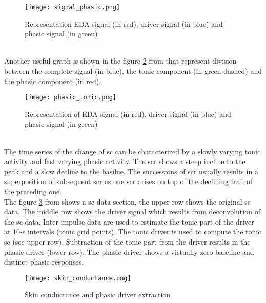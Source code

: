 \begin{figure}[h]
    \centering
    \texttt{[image: signal\_phasic.png]} 
	\caption{Representation EDA signal (in red), driver signal (in blue) and phasic signal (in green)}
    \label{fig:signal_phasic}
\end{figure}
\\
Another useful graph is shown in the figure \ref{fig:phasic_tonic} from \cite{hernandez2014using} that represent division between the complete signal (in blue), the tonic component (in green-dashed) and the phasic component (in red).
\begin{figure}[h]
    \centering
    \texttt{[image: phasic\_tonic.png]} 
	\caption{Representation of EDA signal (in red), driver signal (in blue) and phasic signal (in green)}
    \label{fig:phasic_tonic}
\end{figure}
\\
The time series of the change of \gls{sc} can be characterized by a slowly varying tonic activity and fast varying phasic activity. The \gls{scr} shows a steep incline to the peak and a slow decline to the basilne. The successions of \gls{scr} usually results in a superposition of subsequent \gls{scr} as one \gls{scr} arises on top of the declining trail of the preceding one.
\\
The figure \ref{fig:skin_conductance} from \cite{benedek2010continuous} shows a \gls{sc} data section, the upper row shows the original \gls{sc} data. The middle row shows the driver signal which results from deconvolution of the \gls{sc} data. Inter-impulse data are used to estimate the tonic part of the driver at 10-s intervals (tonic grid points). The tonic driver is used to compute the tonic \gls{sc} (see upper row). Subtraction of the tonic part from the driver results in the phasic driver (lower row). The phasic driver shows a virtually zero baseline and distinct phasic responses. 
\begin{figure}[h]
    \centering
    \texttt{[image: skin\_conductance.png]} 
	\caption{Skin conductance and phasic driver extraction}
    \label{fig:skin_conductance}
\end{figure}

